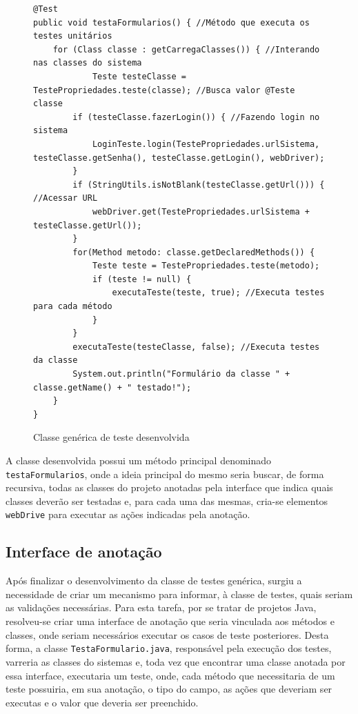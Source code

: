 \documentclass[tg]{mdtufsm}
\begin{document}
\begin{figure}[!htb]
\begin{lstlisting}
@Test
public void testaFormularios() { //Método que executa os testes unitários
	for (Class classe : getCarregaClasses()) { //Interando nas classes do sistema
    		Teste testeClasse = TestePropriedades.teste(classe); //Busca valor @Teste classe
        if (testeClasse.fazerLogin()) { //Fazendo login no sistema
            LoginTeste.login(TestePropriedades.urlSistema, testeClasse.getSenha(), testeClasse.getLogin(), webDriver);
        }
        if (StringUtils.isNotBlank(testeClasse.getUrl())) { //Acessar URL
            webDriver.get(TestePropriedades.urlSistema + testeClasse.getUrl());
        }
        for(Method metodo: classe.getDeclaredMethods()) {
            Teste teste = TestePropriedades.teste(metodo);
            if (teste != null) {
                executaTeste(teste, true); //Executa testes para cada método
            }
        }
        executaTeste(testeClasse, false); //Executa testes da classe
        System.out.println("Formulário da classe " + classe.getName() + " testado!");
	}
}
\end{lstlisting}
    \caption{Classe genérica de teste desenvolvida}
	\label{code:TestaFormularios.java}
\end{figure}

A classe desenvolvida possui um método principal denominado \texttt{testaFormularios}, onde a ideia principal do mesmo seria buscar,
de forma recursiva, todas as classes do projeto anotadas pela interface que indica quais classes deverão ser testadas e, para cada uma das mesmas, cria-se elementos \texttt{webDrive} para executar as ações indicadas pela anotação.

\subsection{Interface de anotação}

Após finalizar o desenvolvimento da classe de testes genérica, surgiu a necessidade de criar um mecanismo para informar, à classe de testes, quais seriam as validações necessárias. Para esta tarefa, por se tratar de projetos Java, resolveu-se criar uma interface de anotação que seria vinculada aos métodos e classes, onde seriam necessários executar os casos de teste posteriores. Desta forma, a classe \texttt{TestaFormulario.java},
responsável pela execução dos testes, varreria as classes do sistemas e, toda vez que encontrar uma classe anotada por essa interface, executaria um teste, onde, cada método que necessitaria de um teste possuiria, em sua anotação, o tipo do campo,
as ações que deveriam ser executas e o valor que deveria ser preenchido.
\end{document}
